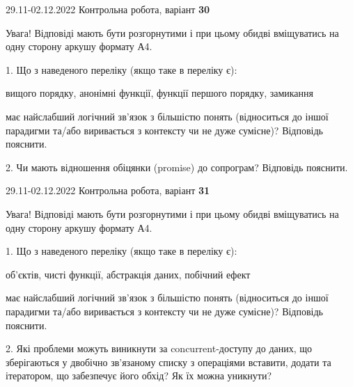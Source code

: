 \documentclass[11pt, ukrainian]{article}
\begin{document}
\vspace{4mm}



{29.11-02.12.2022 Контрольна робота, варіант  \No \textbf { 30 }\par}
Увага! Відповіді мають бути розгорнутими і при цьому обидві вміщуватись на одну сторону аркушу формату А4.

{
\begin {large}

1. Що з наведеного переліку (якщо таке в переліку є):

\vspace{4mm}
 вищого порядку, анонімні функції, функції першого порядку, замикання

\vspace{4mm}
має найслабший логічний зв’язок з більшістю понять (відноситься до іншої парадигми та/або виривається з контексту чи не дуже сумісне)? Відповідь пояснити.


2. Чи мають відношення обіцянки (promise) до сопрограм? Відповідь пояснити.

\end {large}}

\vspace{4mm}



{29.11-02.12.2022 Контрольна робота, варіант  \No \textbf { 31 }\par}
Увага! Відповіді мають бути розгорнутими і при цьому обидві вміщуватись на одну сторону аркушу формату А4.

{
\begin {large}

1. Що з наведеного переліку (якщо таке в переліку є):

\vspace{4mm}
 об’єктів, чисті функції, абстракція даних, побічний ефект

\vspace{4mm}
має найслабший логічний зв’язок з більшістю понять (відноситься до іншої парадигми та/або виривається з контексту чи не дуже сумісне)? Відповідь пояснити.


2. Які проблеми можуть виникнути за concurrent-доступу до даних, що зберігаються у двобічно зв’язаному списку з операціями вставити, додати та ітератором, що забезпечує його обхід? Як їх можна уникнути?

\end {large}}
\end{document}
